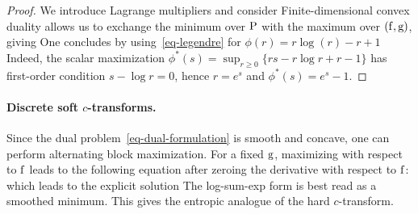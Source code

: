\begin{proof}
We introduce Lagrange multipliers and consider
	Finite-dimensional convex duality allows us to exchange the minimum over $\P$ with the maximum over $(\fD,\gD)$, giving
	One concludes by using~\eqref{eq-legendre} for $\phi(r)=r \log(r)-r+1$
	Indeed, the scalar maximization
	\(\phi^*(s)=\sup_{r\geq0}\{rs-r\log r+r-1\}\)
	has first-order condition $s-\log r=0$, hence $r=e^s$ and $\phi^*(s)=e^s-1$.
\end{proof}

\paragraph{Discrete soft $c$-transforms.}

Since the dual problem~\eqref{eq-dual-formulation} is smooth and concave, one can perform alternating block maximization. For a fixed $\gD$, maximizing with respect to $\fD$ leads to the following equation after zeroing the derivative with respect to $\fD$:
which leads to the explicit solution
The log-sum-exp form is best read as a smoothed minimum. This gives the entropic analogue of the hard $c$-transform.

